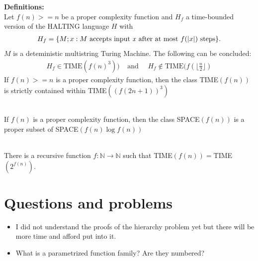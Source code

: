 \documentclass[a4]{scrartcl}
\begin{document}
\textbf{Definitions:} \cite{book, CC} \\
Let $f(n) >= n$ be a proper complexity function and $H_f$ a time-bounded version of the HALTING language $H$ with
\begin{align*}
H_f = \{ M; x:M \text{ accepts input \textit{x} after at most } f(|x|) \text{ steps} \}.
\end{align*}
$M$ is a deteministic multistring Turing Machine. The following can be concluded:
\begin{align*}
H_f \in \text{TIME}(f(n)^3))  \  \ \ \ \ \text{and} \ \ \ \ \ \ H_f \notin \text{TIME}(f(\lfloor \frac{n}{2} \rfloor )
\end{align*}
If $f(n) >= n$ is a proper complexity function, then the class TIME$(f(n))$ is strictly contained within TIME$((f(2n+1))^3)$ 

\ \\
If $f(n)$ is a proper complexity function, then the class SPACE$(f(n))$ is a proper subset of SPACE$(f(n) \log f(n))$ 

\
\\
There is a recursive function $f: \mathbb{N} \rightarrow \mathbb{N}$ such that TIME$(f(n))=$TIME$(2^{f(n)})$.







\section*{Questions and problems}
\begin{itemize}
\item I did not understand the proofs of the hierarchy problem yet but there will be more time and afford put into it.
\item What is a parametrized function family? Are they numbered?
\end{itemize}

\newpage

\printbibliography
\end{document}
